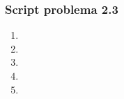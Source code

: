 \documentclass[a4paper,12pt]{article}
\begin{document}
\subsubsection{Script problema 2.3}
\begin{enumerate}[label=(\alph*)]
\item\phantom{-}
\item\phantom{-}
\item\phantom{-}
\item\phantom{-}
\item\phantom{-}
\end{enumerate}
\end{document}
